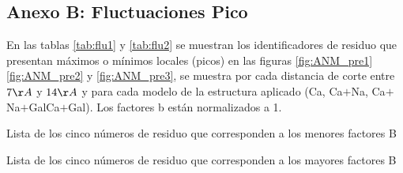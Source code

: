 \begin{appendix}
\chapter{Anexo B: Fluctuaciones Pico}\label{AnexoB}
En las tablas \ref{tab:flu1} y \ref{tab:flu2} se muestran los identificadores de residuo que presentan m\'{a}ximos o m\'{i}nimos locales (picos) en las figuras \ref{fig:ANM_pre1} \ref{fig:ANM_pre2} y \ref{fig:ANM_pre3}, se muestra por cada distancia de corte entre $7\AA$ y $14\AA$ y para cada modelo de la estructura aplicado (Ca, Ca$+$Na, Ca$+$Na$+$GalCa$+$Gal). Los factores b est\'{a}n normalizados a 1. \\
\begin{table}[ht]
\centering
\begin{adjustbox}{width=1.0\textwidth,center}
 
 \end{adjustbox}
 \caption{Lista de los cinco n\'{u}meros de residuo que corresponden a los menores factores B}\label{tab:flu1}
\end{table}
\begin{table}[H]
\centering
\begin{adjustbox}{width=1.0\textwidth,center}
 
 \end{adjustbox}
  \caption{Lista de los cinco n\'{u}meros de residuo que corresponden a los mayores factores B}\label{tab:flu2}
\end{table}

\end{appendix}

